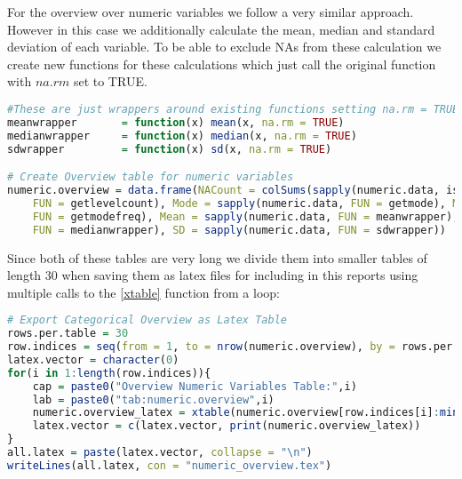 For the overview over numeric variables we follow a very similar approach. However in this case we additionally calculate the mean, median and standard deviation of each variable. To be able to exclude NAs from these calculation we create new functions for these calculations which just call the original function with $na.rm$ set to TRUE.
\begin{lstlisting}[language=R]
#These are just wrappers around existing functions setting na.rm = TRUE
meanwrapper       = function(x) mean(x, na.rm = TRUE)
medianwrapper     = function(x) median(x, na.rm = TRUE)
sdwrapper         = function(x) sd(x, na.rm = TRUE)

# Create Overview table for numeric variables
numeric.overview = data.frame(NACount = colSums(sapply(numeric.data, is.na)), LevelCount = sapply(numeric.data, 
    FUN = getlevelcount), Mode = sapply(numeric.data, FUN = getmode), ModeFrequency = sapply(numeric.data, 
    FUN = getmodefreq), Mean = sapply(numeric.data, FUN = meanwrapper), Median = sapply(numeric.data, 
    FUN = medianwrapper), SD = sapply(numeric.data, FUN = sdwrapper))
\end{lstlisting} 
Since both of these tables are very long we divide them into smaller tables of length 30 when saving them as latex files for including in this reports using multiple calls to the \ref{xtable} function from a loop:
\begin{lstlisting}[language=R]
# Export Categorical Overview as Latex Table
rows.per.table = 30
row.indices = seq(from = 1, to = nrow(numeric.overview), by = rows.per.table)
latex.vector = character(0)
for(i in 1:length(row.indices)){
    cap = paste0("Overview Numeric Variables Table:",i)
    lab = paste0("tab:numeric.overview",i)
    numeric.overview_latex = xtable(numeric.overview[row.indices[i]:min(row.indices[i] + rows.per.table - 1, nrow(numeric.overview)),,drop = FALSE], caption = cap, label =lab)
    latex.vector = c(latex.vector, print(numeric.overview_latex))
}
all.latex = paste(latex.vector, collapse = "\n")
writeLines(all.latex, con = "numeric_overview.tex")
\end{lstlisting} 


